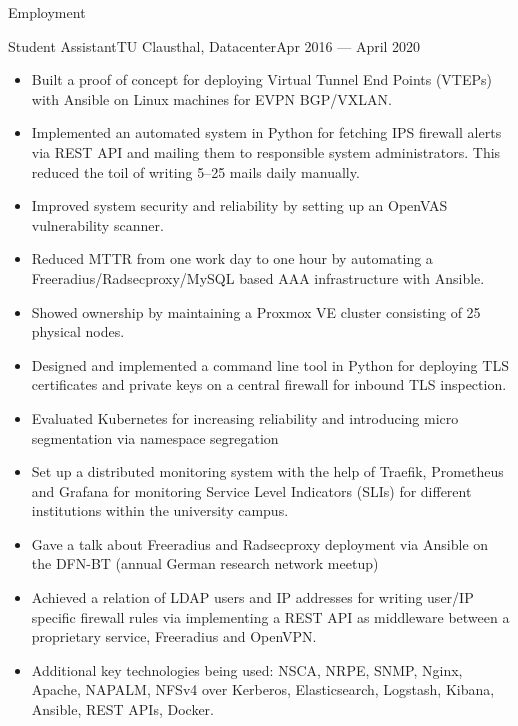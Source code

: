 \documentclass[]{mcdowellcv}
\begin{document}
\makeheader

\begin{cvsection}{Employment}
\begin{cvsubsection}{Student Assistant}{TU Clausthal, Datacenter}{Apr 2016 --- April 2020}

\begin{itemize}
\item Built a proof of concept for deploying Virtual Tunnel End Points (VTEPs) with Ansible on Linux machines for EVPN BGP/VXLAN.
\item Implemented an automated system in Python for fetching IPS firewall alerts via REST API and mailing them to responsible system administrators. This reduced the toil of writing 5--25 mails daily manually.
\item Improved system security and reliability by setting up an OpenVAS vulnerability scanner.
\item Reduced MTTR from one work day to one hour by automating a Freeradius/Radsecproxy/MySQL based AAA infrastructure with Ansible.
\item Showed ownership by maintaining a Proxmox VE cluster consisting of 25 physical nodes.
\item Designed and implemented a command line tool in Python for deploying TLS certificates and private keys on a central firewall for inbound TLS inspection.
\item Evaluated Kubernetes for increasing reliability and introducing micro segmentation via namespace segregation
\item Set up a distributed monitoring system with the help of Traefik, Prometheus and Grafana for monitoring Service Level Indicators (SLIs) for different institutions within the university campus.
\item Gave a talk about Freeradius and Radsecproxy deployment via Ansible on the DFN-BT (annual German research network meetup) 
\item Achieved a relation of LDAP users and IP addresses for writing user/IP specific firewall rules via implementing a REST API as middleware between a proprietary service, Freeradius and OpenVPN.
\item Additional key technologies being used: NSCA, NRPE, SNMP, Nginx, Apache, NAPALM, NFSv4 over Kerberos, Elasticsearch, Logstash, Kibana, Ansible, REST APIs, Docker.
\end{itemize}
\end{cvsubsection}


\end{cvsection}
\end{document}
